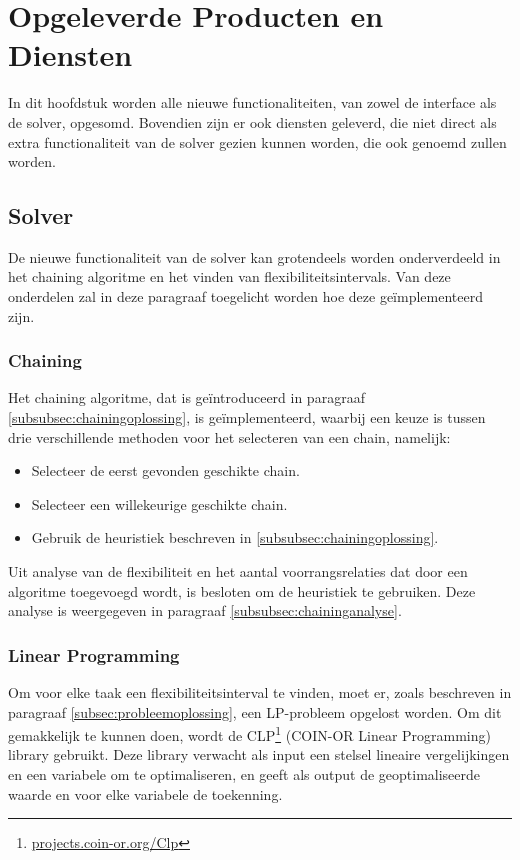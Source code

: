 \section{Opgeleverde Producten en Diensten}

In dit hoofdstuk worden alle nieuwe functionaliteiten, van zowel de interface als de solver, opgesomd. Bovendien zijn er ook diensten geleverd, die niet direct als extra functionaliteit van de solver gezien kunnen worden, die ook genoemd zullen worden.

\subsection{Solver}
De nieuwe functionaliteit van de solver kan grotendeels worden onderverdeeld in het chaining algoritme en het vinden van flexibiliteitsintervals. Van deze onderdelen zal in deze paragraaf toegelicht worden hoe deze ge\"implementeerd zijn.

\subsubsection{Chaining}
Het chaining algoritme, dat is ge\"introduceerd in paragraaf \ref{subsubsec:chainingoplossing}, is ge\"implementeerd, waarbij een keuze is tussen drie verschillende methoden voor het selecteren van een chain, namelijk:
\begin{itemize}
\item Selecteer de eerst gevonden geschikte chain.
\item Selecteer een willekeurige geschikte chain.
\item Gebruik de heuristiek beschreven in \ref{subsubsec:chainingoplossing}.
\end{itemize}

Uit analyse van de flexibiliteit en het aantal voorrangsrelaties dat door een algoritme toegevoegd wordt, is besloten om de heuristiek te gebruiken. Deze analyse is weergegeven in paragraaf \ref{subsubsec:chaininganalyse}.

\subsubsection{Linear Programming}
Om voor elke taak een flexibiliteitsinterval te vinden, moet er, zoals beschreven in paragraaf \ref{subsec:probleemoplossing}, een LP-probleem opgelost worden. Om dit gemakkelijk te kunnen doen, wordt de CLP\footnote{\href{https://projects.coin-or.org/Clp}{projects.coin-or.org/Clp}} (COIN-OR Linear Programming) library gebruikt. Deze library verwacht als input een stelsel lineaire vergelijkingen en een variabele om te optimaliseren, en geeft als output de geoptimaliseerde waarde en voor elke variabele de toekenning.

